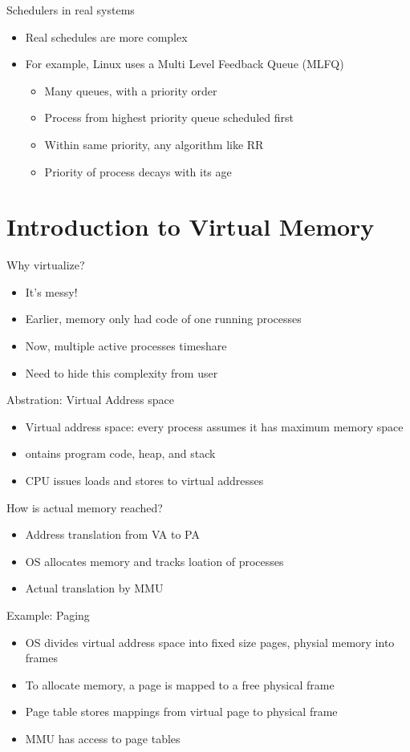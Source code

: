 \documentclass[12pt]{article}
\begin{document}
Schedulers in real systems
\begin{itemize}
    \item Real schedules are more complex
    \item For example, Linux uses a Multi Level Feedback Queue (MLFQ)
    \begin{itemize}
        \item Many queues, with a priority order
        \item Process from highest priority queue scheduled first
        \item Within same priority, any algorithm like RR
        \item Priority of process decays with its age
    \end{itemize}
\end{itemize}

\section{Introduction to Virtual Memory}

Why virtualize?
\begin{itemize}
    \item It's messy!
    \item Earlier, memory only had code of one running processes
    \item Now, multiple active processes timeshare
    \item Need to hide this complexity from user
\end{itemize}

Abstration: Virtual Address space
\begin{itemize}
    \item Virtual address space: every process assumes it has maximum memory space
    \item ontains program code, heap, and stack
    \item CPU issues loads and stores to virtual addresses
\end{itemize}

How is actual memory reached?
\begin{itemize}
    \item Address translation from VA to PA
    \item OS allocates memory and tracks loation of processes
    \item Actual translation by MMU
\end{itemize}

Example: Paging
\begin{itemize}
    \item OS divides virtual address space into fixed size pages, physial memory into frames
    \item To allocate memory, a page is mapped to a free physical frame
    \item Page table stores mappings from virtual page to physical frame
    \item MMU has access to page tables
\end{itemize}
\end{document}
